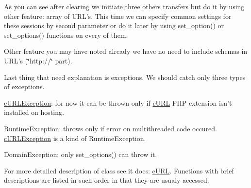 As you can see after clearing we initiate three others transfers but do it by using other feature: array of URL's. This time we can specify common settings for these sessions by second parameter or do it later by using {\ttfamily set\_\-option()} or {\ttfamily set\_\-options()} functions on every of them.

Other feature you may have noted already we have no need to include schemas in URL's (\char`\"{}http://\char`\"{} part).

Last thing that need explanation is exceptions. We should catch only three types of exceptions.
\begin{DoxyItemize}
\item \hyperlink{a00003}{cURLException}: for now it can be thrown only if \hyperlink{a00002}{cURL} PHP extension isn't installed on hosting.
\item RuntimeException: throws only if error on multithreaded code occured. \hyperlink{a00003}{cURLException} is a kind of RuntimeException.
\item DomainException: only {\ttfamily set\_\-options()} can throw it.
\end{DoxyItemize}

For more detailed description of class see it docs: \hyperlink{a00002}{cURL}. Functions with brief descriptions are listed in such order in that they are usualy accessed. 